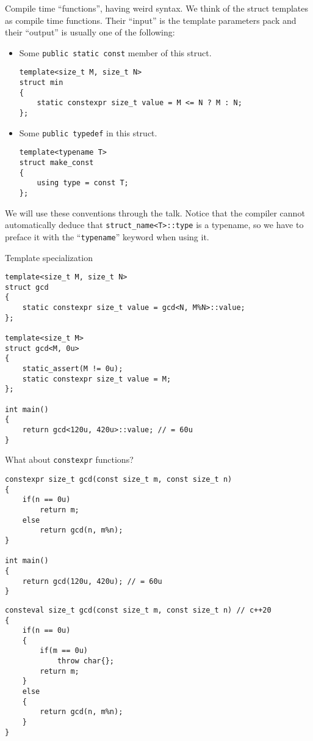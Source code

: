 \documentclass{beamer}
\begin{document}
\begin{frame}[fragile]{Compile time ``functions'', having weird syntax.}
	We think of the struct templates as compile time functions. Their ``input'' is the template parameters pack and their ``output'' is usually one of the following:
	\begin{itemize}
		\item Some \texttt{public static const} member of this struct.
\begin{lstlisting}
template<size_t M, size_t N>
struct min
{
	static constexpr size_t value = M <= N ? M : N;
};
\end{lstlisting}
		\item Some \texttt{public typedef} in this struct.
\begin{lstlisting}
template<typename T>
struct make_const
{
	using type = const T;
};
\end{lstlisting}
	\end{itemize}
We will use these conventions through the talk. Notice that the compiler cannot automatically deduce that \texttt{struct\_name<T>::type} is a typename, so we have to preface it with the ``\texttt{typename}'' keyword when using it.
\end{frame}

\begin{frame}[fragile]{Template specialization}
\begin{lstlisting}
template<size_t M, size_t N>
struct gcd
{
	static constexpr size_t value = gcd<N, M%N>::value;
};

template<size_t M>
struct gcd<M, 0u>
{
	static_assert(M != 0u);
	static constexpr size_t value = M;
};

int main()
{
	return gcd<120u, 420u>::value; // = 60u
}
\end{lstlisting}
\end{frame}

\begin{frame}[fragile]{What about \texttt{constexpr} functions?}
\begin{lstlisting}
constexpr size_t gcd(const size_t m, const size_t n)
{
	if(n == 0u)
		return m;
	else
		return gcd(n, m%n);
}

int main()
{
	return gcd(120u, 420u); // = 60u
}
\end{lstlisting}
\pause
\begin{lstlisting}
consteval size_t gcd(const size_t m, const size_t n) // c++20
{
	if(n == 0u)
	{
		if(m == 0u)
			throw char{};
		return m;
	}
	else
	{
		return gcd(n, m%n);
	}
}
\end{lstlisting}

\end{frame}
\end{document}
